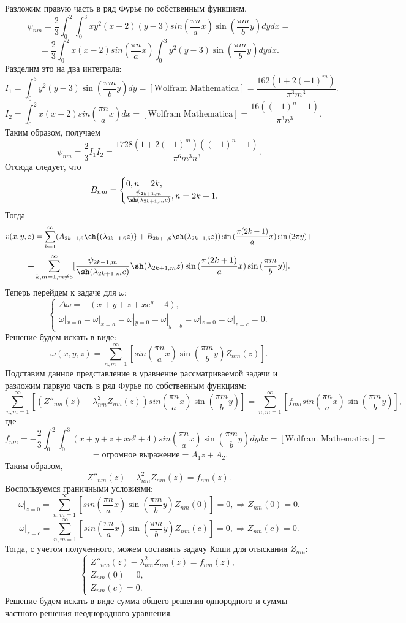 \documentclass[11pt]{article}
\begin{document}
Разложим правую часть в ряд Фурье по собственным функциям.
$$\psi_{nm}=\frac{2}{3}\int_0^2\int_0^3xy^2(x-2)(y-3)sin{(\frac{\pi n}{a}x)}\sin{(\frac{\pi m}{b}y)}dydx=$$
$$=\dfrac23\int_0^2x(x-2)sin{(\frac{\pi n}{a}x)}\int_0^3y^2(y-3)\sin{(\frac{\pi m}{b}y)}dydx.$$
Разделим это на два интеграла:
$$I_1=\int_0^3y^2(y-3)\sin{(\frac{\pi m}{b}y)}dy=[\text{Wolfram Mathematica}]=\frac{162 (1+2(-1)^m)}{\pi ^3 m^3}.$$
$$I_2=\int_0^2x(x-2)sin{(\frac{\pi n}{a}x)}dx=[\text{Wolfram Mathematica}]=\frac{16 ((-1)^n-1)}{\pi ^3 n^3}.$$
Таким образом, получаем
$$\psi_{nm}=\dfrac23I_1I_2=\frac{1728 (1+2(-1)^m)((-1)^n-1)}{\pi ^6 m^3n^3}.$$
Отсюда следует, что 
$$B_{nm}=\begin{cases}
    0,n=2k,\\
    \frac{\psi_{2k+1,m}}{\sh(\lambda_{2k+1,m} c)},n=2k+1.
\end{cases}$$
Тогда $$v(x,y,z)=\sum_{k=1}^\infty (A_{2k+1,6}\ch{(\lambda_{2k+1,6}z)}+B_{2k+1,6}\sh(\lambda_{2k+1,6}z))\sin{(\frac{\pi (2k+1)}{a} x)}\sin{(2\pi y)}+$$
$$+\sum_{k,m=1, m \neq 6}^\infty[ \frac{\psi_{2k+1,m}}{\sh(\lambda_{2k+1,m}c)}\sh(\lambda_{2k+1,m}z)\sin{(\frac{\pi (2k+1)}{a}x)}\sin{(\frac{\pi m}{b}y)}].$$
Теперь перейдем к задаче для $\omega$:
$$\begin{cases}
    \Delta \omega=-(x+y+z+xe^y+4),\\
     \omega|_{x=0}=\omega|_{x=a}=\omega|_{y=0}=\omega|_{y=b}=\omega|_{z=0}=\omega|_{z=c}=0.
\end{cases}$$
Решение будем искать в виде:
$$\omega(x,y,z)=\sum_{n,m=1}^\infty  [sin{(\frac{\pi n}{a}x)}\sin{(\frac{\pi m}{b}y)}Z_{nm}(z)].$$
Подставим данное представление в уравнение рассматриваемой задачи и разложим парвую часть в ряд Фурье по собственным функциям:
$$\sum_{n,m=1}^\infty  [(Z''_{nm}(z)-\lambda^2_{nm}Z_{nm}(z))sin{(\frac{\pi n}{a}x)}\sin{(\frac{\pi m}{b}y)}]=\sum_{n,m=1}^\infty [f_{nm}sin{(\frac{\pi n}{a}x)}\sin{(\frac{\pi m}{b}y)}],$$
где $$f_{nm}=-\dfrac23\int_0^2\int_0^3(x+y+z+xe^y+4)sin{(\frac{\pi n}{a}x)}\sin{(\frac{\pi m}{b}y)}dydx=[\text{Wolfram Mathematica}]=$$
$$=\text{огромное выражение}=A_1z+A_2.$$
Таким образом,
$$Z''_{nm}(z)-\lambda^2_{nm}Z_{nm}(z)=f_{nm}(z).$$
Воспользуемся граничными условиями:
$$\omega|_{z=0}=\sum_{n,m=1}^\infty  [sin{(\frac{\pi n}{a}x)}\sin{(\frac{\pi m}{b}y)}Z_{nm}(0)]=0, \Rightarrow Z_{nm}(0)=0.$$
$$\omega|_{z=c}=\sum_{n,m=1}^\infty  [sin{(\frac{\pi n}{a}x)}\sin{(\frac{\pi m}{b}y)}Z_{nm}(c)]=0, \Rightarrow Z_{nm}(c)=0.$$
Тогда, с учетом полученного, можем составить задачу Коши для отыскания $Z_{nm}:$
$$\begin{cases}
    Z''_{nm}(z)-\lambda^2_{nm}Z_{nm}(z)=f_{nm}(z),\\
    Z_{nm}(0)=0,\\
    Z_{nm}(c)=0.
\end{cases}$$
Решение будем искать в виде сумма общего решения однородного и суммы частного решения неоднородного уравнения.
\end{document}
